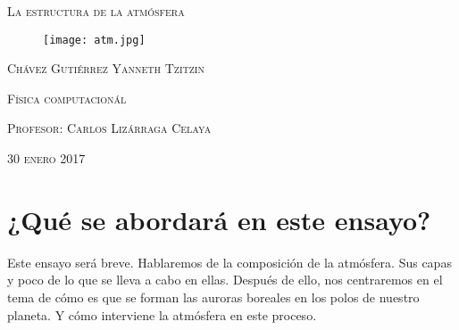 \documentclass{article}
\begin{document}
\begin{center}
\textsc{\LARGE La estructura de la atmósfera}
\linebreak
\begin{figure}[!ht]
\begin{center}
\texttt{[image: atm.jpg]}
\end{center}
\end{figure}

\textsc{Chávez Gutiérrez Yanneth Tzitzin}
\linebreak

\textsc{Física computacionál}
\linebreak

\textsc{Profesor: Carlos Lizárraga Celaya}
\linebreak

\textsc{30 enero 2017}
\end{center}


\pagebreak
\section{¿Qué se abordará en este ensayo?}
\begin{doublespace}
Este ensayo será breve. Hablaremos de la composición de la atmósfera. Sus capas y poco de lo que se lleva a cabo en ellas. Después de ello, nos centraremos en el tema de cómo es que se forman las auroras boreales en los polos de nuestro planeta. Y cómo interviene la atmósfera en este proceso.
\end{doublespace}
\end{document}
